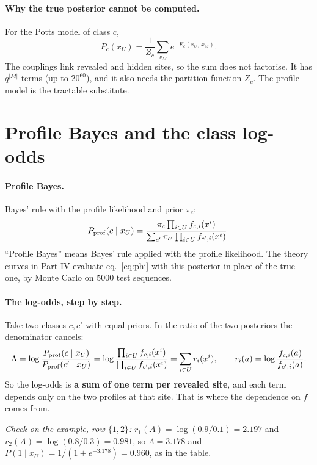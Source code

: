 \documentclass[11pt,a4paper]{article}
\begin{document}
\paragraph{Why the true posterior cannot be computed.} For the Potts model of class $c$,
\[
P_c(x_U)=\frac1{Z_c}\sum_{x_M}e^{-E_c(x_U,\,x_M)} .
\]
The couplings link revealed and hidden sites, so the sum does not factorise. It has $q^{|M|}$ terms (up to $20^{60}$),
and it also needs the partition function $Z_c$. The profile model is the tractable substitute.

\section{Profile Bayes and the class log-odds}
\paragraph{Profile Bayes.} Bayes' rule with the profile likelihood and prior $\pi_c$:
\[
P_{\rm prof}(c\mid x_U)=\frac{\pi_c\prod_{i\in U}f_{c,i}(x^i)}{\sum_{c'}\pi_{c'}\prod_{i\in U}f_{c',i}(x^i)} .
\]
``Profile Bayes'' means Bayes' rule applied with the profile likelihood. The theory curves in Part IV evaluate
eq.~\eqref{eq:phi} with this posterior in place of the true one, by Monte Carlo on 5000 test sequences.

\paragraph{The log-odds, step by step.} Take two classes $c,c'$ with equal priors. In the ratio of the two posteriors the
denominator cancels:
\[
\Lambda=\log\frac{P_{\rm prof}(c\mid x_U)}{P_{\rm prof}(c'\mid x_U)}
=\log\frac{\prod_{i\in U}f_{c,i}(x^i)}{\prod_{i\in U}f_{c',i}(x^i)}
=\sum_{i\in U}r_i(x^i),\qquad r_i(a)=\log\frac{f_{c,i}(a)}{f_{c',i}(a)} .
\]
So the log-odds is \textbf{a sum of one term per revealed site}, and each term depends only on the two profiles at that
site. That is where the dependence on $f$ comes from.

\emph{Check on the example, row $\{1,2\}$:} $r_1(A)=\log(0.9/0.1)=2.197$ and $r_2(A)=\log(0.8/0.3)=0.981$, so
$\Lambda=3.178$ and $P(1\mid x_U)=1/(1+e^{-3.178})=0.960$, as in the table.
\end{document}
